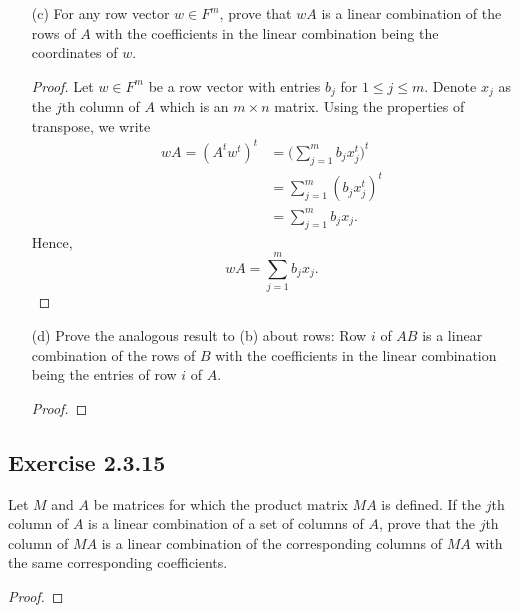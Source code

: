 \begin{enumerate}
\begin{proof}
        \[  {u}_{j} = \sum_{ i=1  }^{ n } {B}_{ij} {x}_{i} \ \text{ for } 1 \leq j \leq p. \]
        \end{proof}
    \item[(c)] For any row vector \( w \in F^{m} \), prove that \( wA  \) is a linear combination of the rows of \( A  \) with the coefficients in the linear combination being the coordinates of \( w  \).
        \begin{proof}
        Let \( w \in F^{m} \) be a row vector with entries \( {b}_{j}  \) for \(  1 \leq j \leq m  \). Denote \( {x}_{j}  \) as the \( j \)th column of \( A  \) which is an \(  m \times n  \) matrix. Using the properties of transpose, we write
        \begin{align*}
            wA = (A^{t} w^{t})^{t} &= \Big( \sum_{ j=1 }^{ m } {b}_{j} {x}^{t}_{j}  \Big)^{t} \\
                                   &= \sum_{ j=1  }^{ m } ({b}_{j} {x}^{t}_{j})^{t} \\
                                   &= \sum_{ j=1  }^{ m } {b}_{j} {x}_{j}.
        \end{align*}
        Hence, 
        \[  wA = \sum_{ j=1  }^{ m } {b}_{j} {x}_{j}. \]

        \end{proof}
    \item[(d)] Prove the analogous result to (b) about rows: Row \( i \) of \( AB  \) is a linear combination of the rows of \( B  \) with the coefficients in the linear combination being the entries of row \( i  \) of \( A  \).
        \begin{proof}
        
        \end{proof}

\end{enumerate}


\subsection*{Exercise 2.3.15} Let \( M  \) and \( A  \) be matrices for which the product matrix \( MA  \) is defined. If the \( j \)th column of \( A  \) is a linear combination of a set of columns of \( A  \), prove that the \( j \)th column of \( MA  \) is a linear combination of the corresponding columns of \( MA  \) with the same corresponding coefficients.
\begin{proof}

\end{proof}

